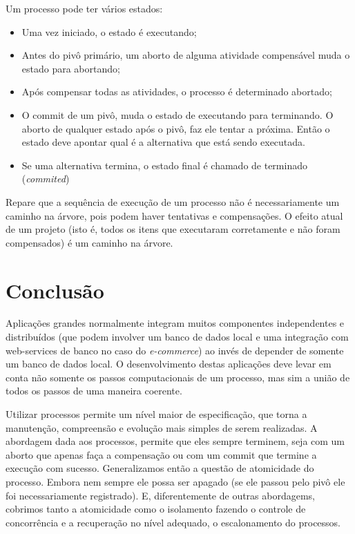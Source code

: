 \documentclass[a4paper,12pt,notitlepage]{article}
\begin{document}
Um processo pode ter vários estados:

\begin{itemize}
  \item Uma vez iniciado, o estado é executando;
  \item Antes do pivô primário, um aborto de alguma atividade compensável muda o estado para abortando;
  \item Após compensar todas as atividades, o processo é determinado abortado;
  \item O commit de um pivô, muda o estado de executando para terminando. O aborto de qualquer estado após o pivô, faz ele tentar a próxima. Então o estado deve apontar qual é a alternativa que está sendo executada.
  \item Se uma alternativa termina, o estado final é chamado de terminado (\textit{commited})
\end{itemize}

Repare que a sequência de execução de um processo não é necessariamente um caminho na árvore, pois podem haver tentativas e compensações. O efeito atual de um projeto (isto é, todos os itens que executaram corretamente e não foram compensados) é um caminho na árvore.




\newpage

\section{Conclusão}

Aplicações grandes normalmente integram muitos componentes independentes e distribuídos (que podem involver um banco de dados local e uma integração com web-services de banco no caso do \textit{e-commerce}) ao invés de depender de 
somente um banco de dados local. O desenvolvimento destas aplicações deve levar em conta não somente os passos computacionais de um processo, mas sim a união de todos os passos de uma maneira coerente. 

Utilizar processos permite um nível maior de especificação, que torna a manutenção, compreensão e evolução mais simples de serem realizadas. A abordagem dada aos processos, permite que eles sempre terminem, seja com um aborto que apenas faça a compensação ou com um commit que termine a execução com sucesso. Generalizamos então a questão de atomicidade do processo. Embora nem sempre ele possa ser apagado (se ele passou pelo pivô ele foi necessariamente registrado). E, diferentemente de outras abordagems, cobrimos tanto a atomicidade como o isolamento fazendo o controle de concorrência e a recuperação no nível adequado, o escalonamento do processos.


 
\end{document}
